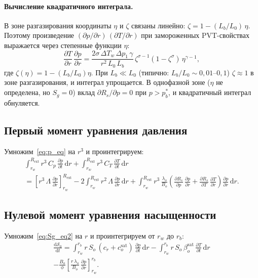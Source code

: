 \documentclass[12pt,a4paper]{article}
\newcommand{\dd}{\mathrm{d}}
\newcommand{\pp}{\partial}
\newcommand{\ext}{\mathrm{ext}}
\newcommand{\sat}{\mathrm{sat}}
\begin{document}
\paragraph{Вычисление квадратичного интеграла.}
В зоне разгазирования координаты $\eta$ и $\zeta$
связаны линейно: $\zeta = 1 - (L_b/L_0)\,\eta$.
Поэтому произведение $(\pp p/\pp r)\,(\pp T/\pp r)$
при замороженных PVT-свойствах выражается через степенные
функции $\eta$:
\[
  \frac{\pp T}{\pp r}\,\frac{\pp p}{\pp r}
  = \frac{2\sigma\,\Delta T_w\,\Delta p_1\,\gamma}
    {r^2\,L_0\,L_b}\,
    \zeta^{\sigma-1}(1-\zeta^\sigma)\,\eta^{\gamma-1},
\]
где $\zeta(\eta) = 1-(L_b/L_0)\eta$.
При $L_b \ll L_0$ (типично: $L_b/L_0 \sim 0{,}01$--$0{,}1$)
$\zeta \approx 1$ в зоне разгазирования, и
интеграл упрощается.
В однофазной зоне ($\eta$ не определена, но $S_g = 0$)
вклад $\pp R_s/\pp p = 0$ при $p > p_b^*$, и
квадратичный интеграл обнуляется.

\subsection{Первый момент уравнения давления}

Умножим~\eqref{eq:p_eq} на $r^3$ и проинтегрируем:
\begin{multline}\label{eq:moment1}
  \int_{r_w}^{R_\ext} r^3\,C_p\,\frac{\pp p}{\pp t}\,\dd r
  + \int_{r_w}^{R_\ext} r^3\,C_T\,\frac{\pp T}{\pp t}\,\dd r \\
  = \left[r^3\,\Lambda\,\frac{\pp p}{\pp r}\right]_{r_w}^{R_\ext}
    - 2\int_{r_w}^{R_\ext} r^2\,\Lambda\,\frac{\pp p}{\pp r}\,\dd r
  + \int_{r_w}^{R_\ext}
    r^3\,\frac{\lambda_o}{B_o}\!\left(
      \frac{\pp R_s}{\pp p}\,\frac{\pp p}{\pp r}
      + \frac{\pp R_s}{\pp T}\,\frac{\pp T}{\pp r}
    \right)\frac{\pp p}{\pp r}\,\dd r.
\end{multline}

\subsection{Нулевой момент уравнения насыщенности}

Умножим~\eqref{eq:Sg_eq2} на $r$ и проинтегрируем от $r_w$ до $r_b$:
\begin{multline}\label{eq:Sg_moment0}
  \frac{\dd\mathcal{S}_0}{\dd t}
  = \int_{r_w}^{r_b} r\,S_o\,(c_r+c_o^\sat)\,
      \frac{\pp p}{\pp t}\,\dd r
    - \int_{r_w}^{r_b} r\,S_o\,\beta_o^\sat\,
      \frac{\pp T}{\pp t}\,\dd r \\
  - \frac{B_o}{\phi}\!\left[
      \frac{r\,\lambda_o}{B_o}\,\frac{\pp p}{\pp r}
    \right]_{r_w}^{r_b}.
\end{multline}
\end{document}
